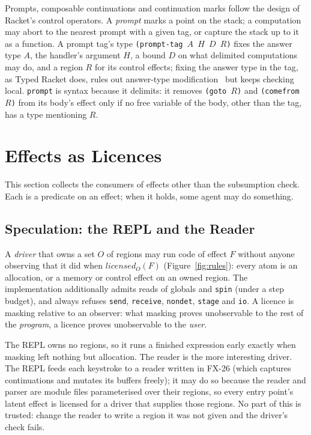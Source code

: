 \documentclass[acmsmall,screen,review]{acmart}
\newcommand{\cd}[1]{\texttt{#1}}
\newcommand{\fx}{FX-26}
\begin{document}
Prompts, composable continuations and continuation marks follow
the design of Racket's control operators. A \emph{prompt} marks a
point on the stack; a computation may abort to the nearest prompt with
a given tag, or capture the stack up to it as a function. A prompt
tag's type
\cd{(prompt-tag $A$ $H$ $D$ $R$)} fixes the answer type $A$, the
handler's argument $H$, a bound $D$ on what delimited computations may
do, and a region $R$ for its control effects; fixing the answer type in
the tag, as Typed Racket does, rules out answer-type
modification~\cite{danvy-filinski,asai-kameyama} but keeps checking
local. \cd{prompt} is syntax because it delimits: it removes
\cd{(goto $R$)} and \cd{(comefrom $R$)} from its body's effect only if
no free variable of the body, other than the tag, has a type mentioning
$R$.

\section{Effects as Licences}
\label{sec:licences}

This section collects the consumers of effects other than the
subsumption check. Each is a predicate on an effect; when it holds,
some agent may do something.

\subsection{Speculation: the REPL and the Reader}

A \emph{driver} that owns a set $O$ of regions may run code of effect
$F$ without anyone observing that it did when $\mathit{licensed}_O(F)$
(Figure~\ref{fig:rules}): every atom is an allocation, or a memory or
control effect on an owned region. The implementation additionally
admits reads of globals and \cd{spin} (under a step budget), and always
refuses \cd{send}, \cd{receive}, \cd{nondet}, \cd{stage} and \cd{io}.
A licence is masking relative to an observer: what masking proves
unobservable to the rest of the \emph{program}, a licence proves
unobservable to the \emph{user}.

The REPL owns no regions, so it runs a finished expression early
exactly when masking left nothing but allocation. The reader is the
more interesting driver. The REPL feeds each keystroke to a reader
written in \fx{} (which captures continuations and mutates its buffers
freely); it may do so because the reader and parser are module files
parameterised over their regions, so every entry point's latent effect
is licensed for a driver that supplies those regions. No part of this
is trusted: change the reader to write a region it was not given and
the driver's check fails.
\end{document}
